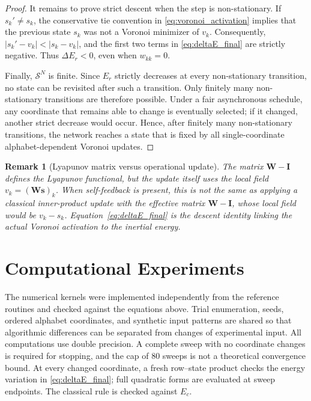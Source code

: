 \documentclass[10pt,journal,letterpaper]{IEEEtran}
\newtheorem{remark}{Remark}
\begin{document}
\begin{proof}
It remains to prove strict descent when the step is non-stationary. If
$s_k'\ne s_k$, the conservative tie convention in
\eqref{eq:voronoi_activation} implies that the previous state $s_k$ was not a
Voronoi minimizer of $v_k$. Consequently,
$|s_k'-v_k|<|s_k-v_k|$, and the first two terms in
\eqref{eq:deltaE_final} are strictly negative. Thus $\Delta E_r<0$, even when
$w_{kk}=0$.

Finally, $\mathcal{S}^N$ is finite. Since $E_r$ strictly decreases at every
non-stationary transition, no state can be revisited after such a transition.
Only finitely many non-stationary transitions are therefore possible. Under a
fair asynchronous schedule, any coordinate that remains able to change is
eventually selected; if it changed, another strict decrease would occur. Hence,
after finitely many non-stationary transitions, the network reaches a state
that is fixed by all single-coordinate alphabet-dependent Voronoi updates.
\end{proof}

\begin{remark}[Lyapunov matrix versus operational update]
The matrix $\boldsymbol{W}-\boldsymbol{I}$ defines the Lyapunov functional, but
the update itself uses the local field $v_k=(\boldsymbol{W}\boldsymbol{s})_k$.
When self-feedback is present, this is not the same as applying a classical
inner-product update with the effective matrix $\boldsymbol{W}-\boldsymbol{I}$,
whose local field would be $v_k-s_k$. Equation~\eqref{eq:deltaE_final} is the
descent identity linking the actual Voronoi activation to the inertial energy.
\end{remark}

\section{Computational Experiments}
\label{sec:experiments}

The numerical kernels were implemented independently from the reference
routines and checked against the equations above. Trial enumeration, seeds,
ordered alphabet coordinates, and synthetic input patterns are shared so that
algorithmic differences can be separated from changes of experimental input.
All computations use double precision. A complete sweep with no coordinate
changes is required for stopping, and the cap of 80 sweeps is not a theoretical
convergence bound. At every changed coordinate, a fresh row--state product
checks the energy variation in \eqref{eq:deltaE_final}; full quadratic forms
are evaluated at sweep endpoints. The classical rule is checked against $E_c$.
\end{document}
